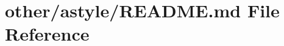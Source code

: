 \hypertarget{other_2astyle_2_r_e_a_d_m_e_8md}{\section{other/astyle/\+R\+E\+A\+D\+M\+E.md File Reference}
\label{other_2astyle_2_r_e_a_d_m_e_8md}
}
